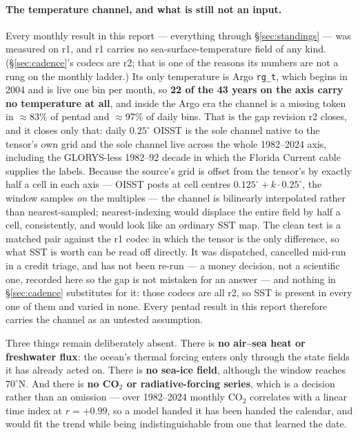 \documentclass[10pt]{article}
\begin{document}
\paragraph{The temperature channel, and what is still not an input.}
Every monthly result in this report --- everything through
\S\ref{sec:standings} --- was measured on r1, and r1 carries no
sea-surface-temperature field of any kind. (\S\ref{sec:cadence}'s codecs
are r2; that is one of the reasons its numbers are not a rung on the
monthly ladder.) Its only temperature is Argo
\texttt{rg\_t}, which begins in 2004 and is live one bin per month, so
\textbf{22 of the 43 years on the axis carry no temperature at all}, and
inside the Argo era the channel is a missing token in $\approx$83\% of
pentad and $\approx$97\% of daily bins. That is the gap revision r2
closes, and it closes only that: daily $0.25^\circ$ OISST is the sole
channel native to the tensor's own grid and the sole channel live across
the whole 1982--2024 axis, including the GLORYS-less 1982--92 decade in
which the Florida Current cable supplies the labels. Because the source's
grid is offset from the tensor's by exactly half a cell in each axis ---
OISST posts at cell centres $0.125^\circ + k\cdot0.25^\circ$, the window
samples \emph{on} the multiples --- the channel is bilinearly
interpolated rather than nearest-sampled; nearest-indexing would displace
the entire field by half a cell, consistently, and would look like an
ordinary SST map. The clean test is a matched pair against the r1 codec
in which the tensor is the only difference, so what SST is worth can be
read off directly. It was dispatched, cancelled mid-run in a credit
triage, and has not been re-run --- a money decision, not a scientific
one, recorded here so the gap is not mistaken for an answer --- and
nothing in \S\ref{sec:cadence} substitutes for it: those codecs are all r2,
so SST is present in every one of them and varied in none. Every pentad
result in this report therefore carries the channel as an untested
assumption.

Three things remain deliberately absent. There is \textbf{no air--sea heat
or freshwater flux}: the ocean's thermal forcing enters only through the
state fields it has already acted on. There is \textbf{no sea-ice field},
although the window reaches $70^\circ$N. And there is \textbf{no CO$_2$ or
radiative-forcing series}, which is a decision rather than an omission ---
over 1982--2024 monthly CO$_2$ correlates with a linear time index at
$r={+}0.99$, so a model handed it has been handed the calendar, and would
fit the trend while being indistinguishable from one that learned the date.
\end{document}
